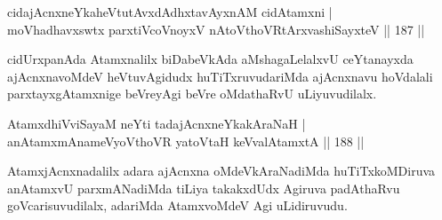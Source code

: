 \begin{shl}
cidajAcnxneYkaheVtutAvxdAdhxtavAyxnAM cidAtamxni |\\
moVhadhavxswtx parxtiVcoV\s noyxV nAtoV\s thoVR\s tArxvashiSayxteV \hfill || 187 ||
\end{shl}

\begin{artha}
cidUrxpanAda Atamxnalilx biDabeVkAda aMshagaLelalxvU ceYtanayxda ajAcnxnavoMdeV heVtuvAgidudx huTiTxruvudariMda ajAcnxnavu hoVdalali parxtayxgAtamxnige beVreyAgi beVre oMdathaRvU uLiyuvudilalx.
\end{artha}


\begin{shl}
AtamxdhiVviSayaM neYti tadajAcnxneYkakAraNaH |\\
anAtamxmAnameVyoV\s thoVR yatoV\s taH keVvalAtamxtA \hfill || 188 ||
\end{shl}

\begin{artha}
AtamxjAcnxnadalilx adara ajAcnxna oMdeVkAraNadiMda huTiTxkoMDiruva anAtamxvU parxmANadiMda tiLiya takakxdUdx Agiruva padAthaRvu goVcarisuvudilalx, adariMda AtamxvoMdeV Agi uLidiruvudu.
\end{artha}

